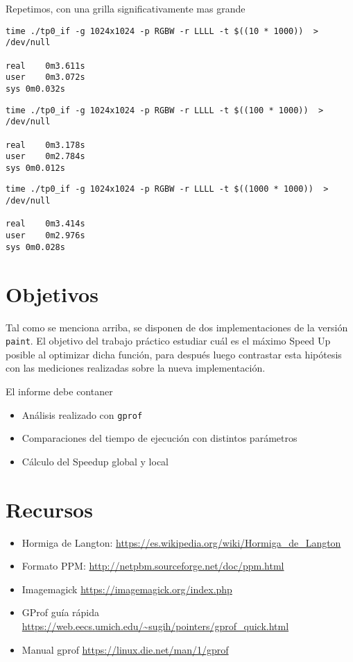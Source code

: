 \documentclass{article}
\begin{document}
Repetimos, con una grilla significativamente mas grande
\begin{verbatim}
time ./tp0_if -g 1024x1024 -p RGBW -r LLLL -t $((10 * 1000))  > /dev/null

real	0m3.611s
user	0m3.072s
sys	0m0.032s
\end{verbatim}

\begin{verbatim}
time ./tp0_if -g 1024x1024 -p RGBW -r LLLL -t $((100 * 1000))  > /dev/null

real	0m3.178s
user	0m2.784s
sys	0m0.012s
\end{verbatim}

\begin{verbatim}
time ./tp0_if -g 1024x1024 -p RGBW -r LLLL -t $((1000 * 1000))  > /dev/null

real	0m3.414s
user	0m2.976s
sys	0m0.028s
\end{verbatim}

\section{Objetivos}
Tal como se menciona arriba, se disponen de dos implementaciones de la versión \texttt{paint}. 
El objetivo del trabajo práctico estudiar cuál es el máximo Speed Up posible al optimizar dicha función, para después  
luego contrastar esta hipótesis con las mediciones realizadas sobre la nueva implementación.

El informe debe contaner
\begin{itemize}
\item Análisis realizado con \texttt{gprof}
\item Comparaciones del tiempo de ejecución con distintos parámetros
\item Cálculo del Speedup global y local
\end{itemize}

\section{Recursos}\label{Recursos}

\begin{itemize}
\item Hormiga de Langton: \url{https://es.wikipedia.org/wiki/Hormiga_de_Langton}
\item Formato PPM: \url{http://netpbm.sourceforge.net/doc/ppm.html}
\item Imagemagick \url{https://imagemagick.org/index.php}
\item GProf guía rápida \url{https://web.eecs.umich.edu/~sugih/pointers/gprof_quick.html}
\item Manual gprof \url{https://linux.die.net/man/1/gprof}

\end{itemize}
\end{document}
